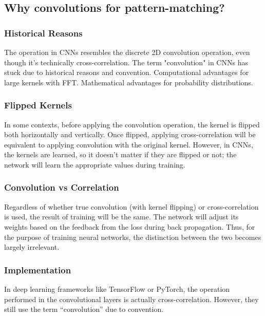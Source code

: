 \documentclass[11pt]{article}
\begin{document}
\subsection{Why convolutions for pattern-matching?}

\subsubsection{Historical Reasons}

The operation in CNNs resembles the discrete 2D convolution operation, even though it's technically cross-correlation. The term "convolution" in CNNs has stuck due to historical reasons and convention. Computational advantages for large kernels with FFT. Mathematical advantages for probability distributions.

\subsubsection{Flipped Kernels}

In some contexts, before applying the convolution operation, the kernel is flipped both horizontally and vertically. Once flipped, applying cross-correlation will be equivalent to applying convolution with the original kernel. However, in CNNs, the kernels are learned, so it doesn't matter if they are flipped or not; the network will learn the appropriate values during training.

\subsubsection{Convolution vs Correlation} 

Regardless of whether true convolution (with kernel flipping) or cross-correlation is used, the result of training will be the same. The network will adjust its weights based on the feedback from the loss during back propagation. Thus, for the purpose of training neural networks, the distinction between the two becomes largely irrelevant.

\subsubsection{Implementation}

In deep learning frameworks like TensorFlow or PyTorch, the operation performed in the convolutional layers is actually cross-correlation. However, they still use the term ``convolution'' due to convention.
\end{document}
